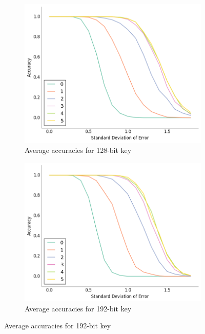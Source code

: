 \documentclass{project-logbook}
\begin{document}
{\begin{figure}[htp]
    \centering
    \begin{subfigure}{0.48\textwidth}
        \centering
        \includegraphics[width=\textwidth]{figures/accuracy_128.png}
        \caption{Average accuracies for 128-bit key}
    \end{subfigure}
    \hspace{.35cm}
    \begin{subfigure}{0.48\textwidth}
        \centering
        \includegraphics[width=\textwidth]{figures/accuracy_192.png}
        \caption{Average accuracies for 192-bit key}
    \end{subfigure}%


\end{figure}}
\end{document}
